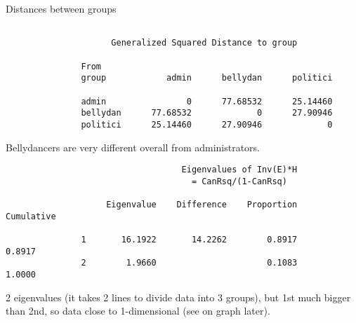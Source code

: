 \documentclass[pdf]{prosper}
\begin{document}
\begin{slide}{Distances between groups}

{\scriptsize
\begin{verbatim}

                     Generalized Squared Distance to group

               From
               group            admin      bellydan      politici

               admin                0      77.68532      25.14460
               bellydan      77.68532             0      27.90946
               politici      25.14460      27.90946             0
\end{verbatim}
}

Bellydancers are very different overall from administrators.

{\scriptsize
\begin{verbatim}
                                   Eigenvalues of Inv(E)*H
                                     = CanRsq/(1-CanRsq)

                    Eigenvalue    Difference    Proportion    Cumulative

               1       16.1922       14.2262        0.8917        0.8917
               2        1.9660                      0.1083        1.0000

\end{verbatim}
}

2 eigenvalues (it takes 2 lines to divide data into 3 groups), but 1st much bigger than 2nd, so data close to 1-dimensional (see on graph later).

\end{slide}
\end{document}

